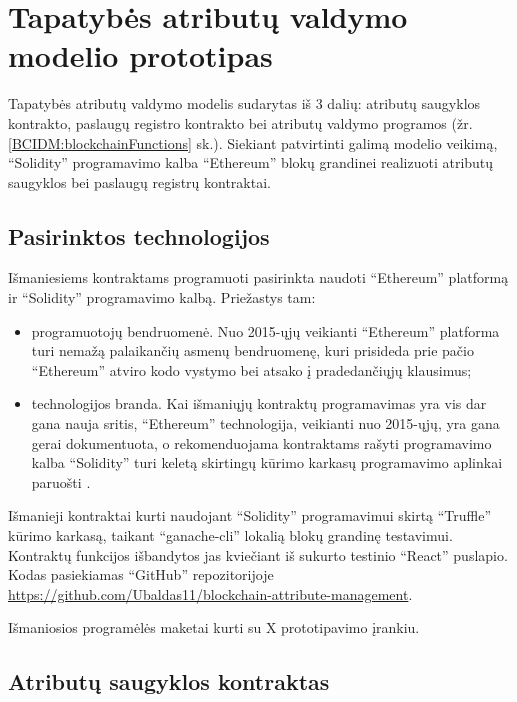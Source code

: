 \section{Tapatybės atributų valdymo modelio prototipas}

Tapatybės atributų valdymo modelis sudarytas iš 3 dalių: atributų saugyklos kontrakto, paslaugų registro kontrakto bei
atributų valdymo programos (žr. \hypertarget{BCIDM:blockchainFunctions}{\ref{BCIDM:blockchainFunctions}} sk.).
Siekiant patvirtinti galimą modelio veikimą, \enquote{Solidity} programavimo kalba \enquote{Ethereum} blokų grandinei
realizuoti atributų saugyklos bei paslaugų registrų kontraktai. 

\subsection{Pasirinktos technologijos}

Išmaniesiems kontraktams programuoti pasirinkta naudoti \enquote{Ethereum} platformą ir \enquote{Solidity} programavimo
kalbą. Priežastys tam:

\begin{itemize}
    \item programuotojų bendruomenė. Nuo 2015-ųjų veikianti \enquote{Ethereum} platforma turi nemažą
    palaikančių asmenų bendruomenę, kuri prisideda prie pačio \enquote{Ethereum} atviro kodo vystymo
    bei atsako į pradedančiųjų klausimus;
    \item technologijos branda. Kai išmaniųjų kontraktų programavimas yra vis dar gana nauja sritis,
    \enquote{Ethereum} technologija, veikianti nuo 2015-ųjų, yra gana gerai dokumentuota, o rekomenduojama kontraktams rašyti programavimo kalba
    \enquote{Solidity} \cite{Ethereum} turi keletą skirtingų kūrimo karkasų programavimo aplinkai paruošti \cite{SolidityDocumentation}.
\end{itemize}

Išmanieji kontraktai kurti naudojant \enquote{Solidity} programavimui skirtą \enquote{Truffle} kūrimo karkasą,
taikant \enquote{ganache-cli} lokalią blokų grandinę testavimui. Kontraktų funkcijos išbandytos jas kviečiant iš sukurto testinio
\enquote{React} puslapio. Kodas pasiekiamas \enquote{GitHub} repozitorijoje
\url{https://github.com/Ubaldas11/blockchain-attribute-management}.

Išmaniosios programėlės maketai kurti su X prototipavimo įrankiu.

\subsection{Atributų saugyklos kontraktas}

